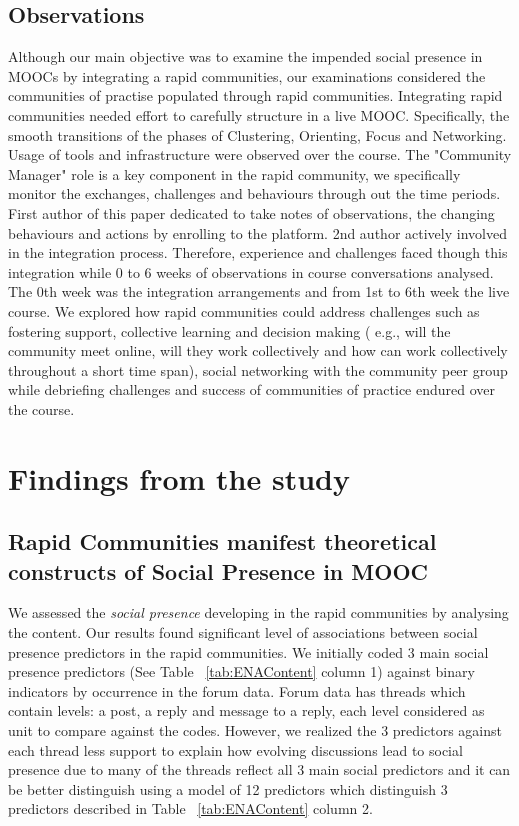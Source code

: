 \documentclass[manuscript,screen,review]{acmart}
\begin{document}
\subsection{Observations}
Although our main objective was to examine the impended social presence in MOOCs by integrating a rapid communities, our examinations considered the communities of practise populated through rapid communities. Integrating rapid communities needed effort to carefully structure in a live MOOC. Specifically, the smooth transitions of the phases of Clustering, Orienting, Focus and Networking. Usage of tools and infrastructure were observed over the course. The "Community Manager" role is a key component in the rapid community, we specifically monitor the exchanges, challenges and behaviours through out the time periods. First author of this paper dedicated to take notes of observations, the changing behaviours and actions by enrolling to the platform. 2nd author actively involved in the integration process. Therefore, experience and challenges faced though this integration while 0 to 6 weeks of observations in course  conversations analysed. The 0th week was the integration arrangements and from 1st to 6th week the live course. We explored how rapid communities could address challenges such as  fostering support, collective learning and decision making ( e.g., will the community meet online, will they work collectively and how can work collectively throughout a short time span), social networking with the community peer group while debriefing challenges and success of communities of practice endured over the course. 

\section{Findings from the study}

\subsection{Rapid Communities manifest theoretical constructs of Social Presence in MOOC}
We assessed the \textit{social presence} developing in the rapid communities by analysing the content. Our results found significant level of associations between social presence predictors in the rapid communities. We initially coded 3 main social presence predictors (See Table ~\ref{tab:ENAContent} column 1) against binary indicators by occurrence in the forum data. Forum data has threads which contain levels: a post, a reply and message to a reply, each level considered as unit to compare against the codes. However, we realized the 3 predictors against each thread less support to explain how evolving discussions lead to social presence due to many of the threads reflect all 3 main social predictors and it can be better distinguish using a model of 12 predictors which distinguish 3 predictors described in Table ~\ref{tab:ENAContent} column 2. 
\end{document}
